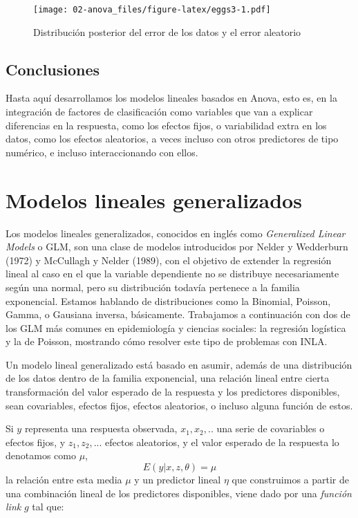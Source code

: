 \documentclass[
]{book}
\begin{document}
\begin{figure}
\centering
\texttt{[image: 02-anova\_files/figure-latex/eggs3-1.pdf]}
\caption{\label{fig:eggs3}Distribución posterior del error de los datos y el error aleatorio}
\end{figure}

\hypertarget{conclusiones-1}{%
\section{Conclusiones}\label{conclusiones-1}}

Hasta aquí desarrollamos los modelos lineales basados en Anova, esto es, en la integración de factores de clasificación como variables que van a explicar diferencias en la respuesta, como los efectos fijos, o variabilidad extra en los datos, como los efectos aleatorios, a veces incluso con otros predictores de tipo numérico, e incluso interaccionando con ellos.

\hypertarget{glm}{%
\chapter{Modelos lineales generalizados}\label{glm}}

Los modelos lineales generalizados, conocidos en inglés como
\emph{Generalized Linear Models} o GLM, son una clase de modelos introducidos
por Nelder y Wedderburn (1972) y McCullagh y Nelder (1989), con el
objetivo de extender la regresión lineal al caso en el que la variable
dependiente no se distribuye necesariamente según una normal, pero su
distribución todavía pertenece a la familia exponencial. Estamos
hablando de distribuciones como la Binomial, Poisson, Gamma, o Gausiana
inversa, básicamente. Trabajamos a continuación con dos de los GLM más
comunes en epidemiología y ciencias sociales: la regresión logística y
la de Poisson, mostrando cómo resolver este tipo de problemas con INLA.

Un modelo lineal generalizado está basado en asumir, además de una
distribución de los datos dentro de la familia exponencial, una relación
lineal entre cierta transformación del valor esperado de la respuesta y
los predictores disponibles, sean covariables, efectos fijos, efectos
aleatorios, o incluso alguna función de estos.

Si \(y\) representa una respuesta observada, \(x_1,x_2,..\) una serie de
covariables o efectos fijos, y \(z_1,z_2,...\) efectos aleatorios, y el
valor esperado de la respuesta lo denotamos como \(\mu\),
\[E(y|x,z,\theta)=\mu\] la relación entre esta media \(\mu\) y un
predictor lineal \(\eta\) que construimos a partir de una combinación
lineal de los predictores disponibles, viene dado por una \emph{función link}
\(g\) tal que:
\end{document}
